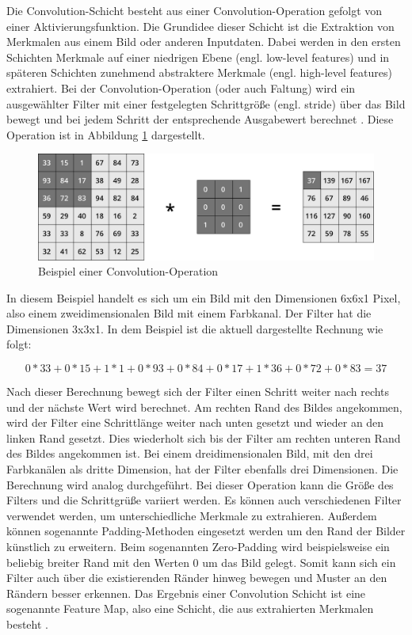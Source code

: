 Die Convolution-Schicht besteht aus einer Convolution-Operation gefolgt von einer Aktivierungsfunktion. Die Grundidee dieser Schicht ist die Extraktion von Merkmalen aus einem Bild oder anderen Inputdaten. Dabei werden in den ersten Schichten Merkmale auf einer niedrigen Ebene (engl. low-level features) und in späteren Schichten zunehmend abstraktere Merkmale (engl. high-level features) extrahiert. Bei der Convolution-Operation (oder auch Faltung) wird ein ausgewählter Filter mit einer festgelegten Schrittgröße (engl. stride) über das Bild bewegt und bei jedem Schritt der entsprechende Ausgabewert berechnet \cite{lecun1998cnn}. Diese Operation ist in Abbildung \ref{fig_conv_operation} dargestellt.

\begin{figure}[h]
\centering
\includegraphics[scale=0.4]{images/conv_operation.pdf}
\caption{Beispiel einer Convolution-Operation}
\label{fig_conv_operation}
\end{figure}

In diesem Beispiel handelt es sich um ein Bild mit den Dimensionen 6x6x1 Pixel, also einem zweidimensionalen Bild mit einem Farbkanal. Der Filter hat die Dimensionen 3x3x1. In dem Beispiel ist die aktuell dargestellte Rechnung wie folgt:

\begin{equation*}
0*33+0*15+1*1+0*93+0*84+0*17+1*36+0*72+0*83=37
\end{equation*}

Nach dieser Berechnung bewegt sich der Filter einen Schritt weiter nach rechts und der nächste Wert wird berechnet. Am rechten Rand des Bildes angekommen, wird der Filter eine Schrittlänge weiter nach unten gesetzt und wieder an den linken Rand gesetzt. Dies wiederholt sich bis der Filter am rechten unteren Rand des Bildes angekommen ist. Bei einem dreidimensionalen Bild, mit den drei Farbkanälen als dritte Dimension, hat der Filter ebenfalls drei Dimensionen. Die Berechnung wird analog durchgeführt. Bei dieser Operation kann die Größe des Filters und die Schrittgrüße variiert werden. Es können auch verschiedenen Filter verwendet werden, um unterschiedliche Merkmale zu extrahieren. Außerdem können sogenannte Padding-Methoden eingesetzt werden um den Rand der Bilder künstlich zu erweitern. Beim sogenannten Zero-Padding wird beispielsweise ein beliebig breiter Rand mit den Werten 0 um das Bild gelegt. Somit kann sich ein Filter auch über die existierenden Ränder hinweg bewegen und Muster an den Rändern besser erkennen. Das Ergebnis einer Convolution Schicht ist eine sogenannte Feature Map, also eine Schicht, die aus extrahierten Merkmalen besteht \cite{lecun1997convolutional}.

